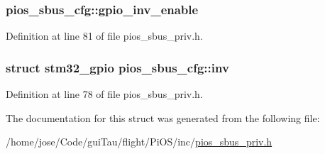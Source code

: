 \hypertarget{structpios__sbus__cfg_ab2b1ec166136b6e8ecfc96fa0c1319b5}{
\subsubsection[{gpio\-\_\-inv\-\_\-enable}]{ pios\-\_\-sbus\-\_\-cfg\-::gpio\-\_\-inv\-\_\-enable}}\label{structpios__sbus__cfg_ab2b1ec166136b6e8ecfc96fa0c1319b5}


Definition at line 81 of file pios\-\_\-sbus\-\_\-priv.\-h.

\hypertarget{structpios__sbus__cfg_af25f459d6167f8ba7a038ae53b458c46}{
\subsubsection[{inv}]{\setlength{\rightskip}{0pt plus 5cm}struct {\bf stm32\-\_\-gpio} pios\-\_\-sbus\-\_\-cfg\-::inv}}\label{structpios__sbus__cfg_af25f459d6167f8ba7a038ae53b458c46}


Definition at line 78 of file pios\-\_\-sbus\-\_\-priv.\-h.



The documentation for this struct was generated from the following file\-:\begin{DoxyCompactItemize}
\item 
/home/jose/\-Code/gui\-Tau/flight/\-Pi\-O\-S/inc/\hyperlink{pios__sbus__priv_8h}{pios\-\_\-sbus\-\_\-priv.\-h}\end{DoxyCompactItemize}
